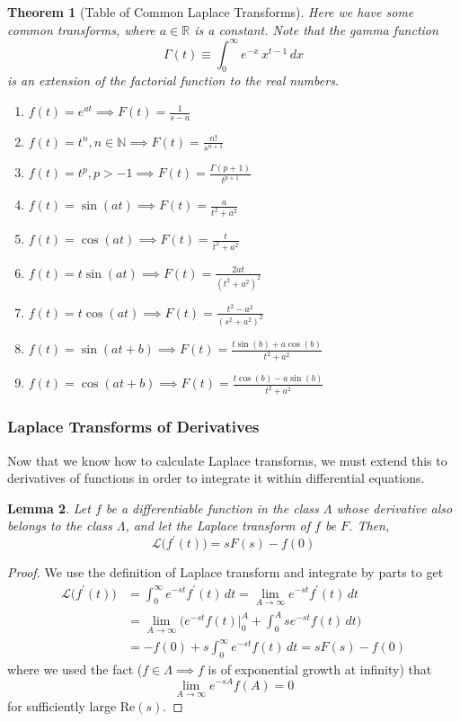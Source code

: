 \documentclass{article}
\newtheorem{theorem}{Theorem}[section]
\newtheorem{lemma}[theorem]{Lemma}
\theoremstyle{remark}
\theoremstyle{definition}
\begin{document}
\begin{theorem}[Table of Common Laplace Transforms]
Here we have some common transforms, where $a \in \mathbb{R}$ is a constant. Note that the gamma function
\[\Gamma(t) \equiv \int_{0}^\infty e^{-x} \, x^{t-1}\,dx\]
is an extension of the factorial function to the real numbers. 
\begin{enumerate}
    \item $f(t) = e^{a t} \implies F(t) = \frac{1}{s-a}$
    \item $f(t) = t^n, n \in \mathbb{N} \implies F(t) = \frac{n!}{s^{n+1}}$
    \item $f(t) = t^p, p > -1 \implies F(t) = \frac{\Gamma(p+1)}{t^{p+1}}$
    \item $f(t) = \sin(at) \implies F(t) = \frac{a}{t^2 + a^2}$
    \item $f(t) = \cos(at) \implies F(t) = \frac{t}{t^2 + a^2}$ 
    \item $f(t) = t \sin(at) \implies F(t) = \frac{2 a t}{(t^2 + a^2)^2}$
    \item $f(t) = t \cos(at) \implies F(t) = \frac{t^2 - a^2}{(s^2 + a^2)^2}$
    \item $f(t) = \sin(a t + b) \implies F(t) = \frac{t \sin(b) + a \cos(b)}{t^2 + a^2}$
    \item $f(t) = \cos(a t + b) \implies F(t) = \frac{t \cos(b) - a \sin(b)}{t^2 + a^2}$
\end{enumerate}
\end{theorem}

\subsubsection{Laplace Transforms of Derivatives}
Now that we know how to calculate Laplace transforms, we must extend this to derivatives of functions in order to integrate it within differential equations. 

\begin{lemma}
Let $f$ be a differentiable function in the class $\Lambda$ whose derivative also belongs to the class $\Lambda$, and let the Laplace transform of $f$ be $F$. Then, 
\[\mathcal{L} \big( f^\prime (t) \big) = s F(s) - f(0) \]
\end{lemma}
\begin{proof}
We use the definition of Laplace transform and integrate by parts to get 
\begin{align*}
    \mathcal{L}\big( f^\prime (t) \big) & = \int_0^\infty e^{-st} f^\prime (t) \,dt = \lim_{A \rightarrow \infty} e^{-st} f^\prime (t) \,dt \\
    & = \lim_{A\rightarrow \infty} \bigg( e^{-st} f(t) \big|_0^A + \int_0^A s e^{-st} f(t)\,dt\bigg) \\
    & = - f(0) + s\int_0^\infty e^{-st} f(t) \,dt = s F(s) - f(0)
\end{align*}
where we used the fact ($f \in \Lambda \implies f$ is of exponential growth at infinity) that 
\[\lim_{A \rightarrow \infty} e^{-sA} f(A) = 0\]
for sufficiently large Re$(s)$. 
\end{proof}
\end{document}
